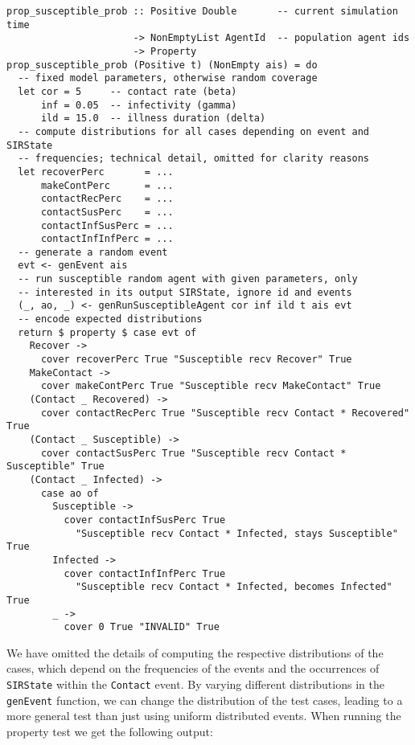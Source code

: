 \begin{footnotesize}
\begin{verbatim}
prop_susceptible_prob :: Positive Double       -- current simulation time
                      -> NonEmptyList AgentId  -- population agent ids 
                      -> Property
prop_susceptible_prob (Positive t) (NonEmpty ais) = do
  -- fixed model parameters, otherwise random coverage
  let cor = 5     -- contact rate (beta)
      inf = 0.05  -- infectivity (gamma)
      ild = 15.0  -- illness duration (delta)
  -- compute distributions for all cases depending on event and SIRState
  -- frequencies; technical detail, omitted for clarity reasons
  let recoverPerc       = ...
      makeContPerc      = ...
      contactRecPerc    = ...
      contactSusPerc    = ...
      contactInfSusPerc = ...
      contactInfInfPerc = ...
  -- generate a random event
  evt <- genEvent ais
  -- run susceptible random agent with given parameters, only
  -- interested in its output SIRState, ignore id and events
  (_, ao, _) <- genRunSusceptibleAgent cor inf ild t ais evt
  -- encode expected distributions
  return $ property $ case evt of 
    Recover -> 
      cover recoverPerc True "Susceptible recv Recover" True
    MakeContact -> 
      cover makeContPerc True "Susceptible recv MakeContact" True
    (Contact _ Recovered) -> 
      cover contactRecPerc True "Susceptible recv Contact * Recovered" True
    (Contact _ Susceptible) -> 
      cover contactSusPerc True "Susceptible recv Contact * Susceptible" True
    (Contact _ Infected) -> 
      case ao of
        Susceptible ->
          cover contactInfSusPerc True 
            "Susceptible recv Contact * Infected, stays Susceptible" True
        Infected ->
          cover contactInfInfPerc True 
            "Susceptible recv Contact * Infected, becomes Infected" True
        _ ->
          cover 0 True "INVALID" True
\end{verbatim}
\end{footnotesize}

We have omitted the details of computing the respective distributions of the cases, which depend on the frequencies of the events and the occurrences of \texttt{SIRState} within the \texttt{Contact} event. By varying different distributions in the \texttt{genEvent} function, we can change the distribution of the test cases, leading to a more general test than just using uniform distributed events. When running the property test we get the following output:

